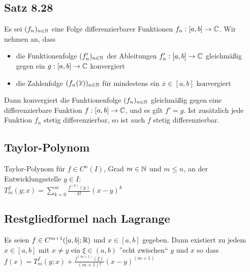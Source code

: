 \documentclass[german]{latex4ei/latex4ei_sheet}
\begin{document}



\begin{sectionbox}
	\subsection{Satz 8.28}
	Es sei $(f_n)_{n \in \operatorname{\mathbb N}}$ eine Folge differenzierbarer Funktionen $f_n : [a, b] \rightarrow \mathbb C$. Wir nehmen an, dass
	\begin{itemize}
		\item die Funktionenfolge $(f'_n)_{n \in \operatorname{\mathbb N}}$ der Ableitungen $f'_n : [a, b] \rightarrow \mathbb C$ gleichmäßig gegen ein $ g : [a, b] \rightarrow \mathbb C$ konvergiert
		\item die Zahlenfolge $(f_n(\overline{x}))_{n \in \operatorname{\mathbb N}}$ für mindestens ein $\overline{x} \in  [a, b]$ konvergiert
	\end{itemize}
	Dann konvergiert die Funktionenfolge $(f_n)_{n \in \operatorname{\mathbb N}}$ gleichmäßig gegen eine differenzierbare Funktion $f : [a,b] \rightarrow \mathbb C$, und es gilt $f' = g$. Ist zusätzlich jede Funktion $f_n$ stetig differenzierbar, so ist auch $f$ stetig differenzierbar.

\end{sectionbox}

\begin{sectionbox}
	\subsection{Taylor-Polynom}
	Taylor-Polynom für $f \in C^n(I)$, Grad $m \in \operatorname{\mathbb N}$ und $m \le n$, an der Entwicklungsstelle $y \in I$:\\
	$T_m^f(y;x)= \sum \limits_{k=0}^{m} \frac{f^{(k)}(y)}{k!}(x-y)^k$

\end{sectionbox}

\begin{sectionbox}
	\subsection{Restgliedformel nach Lagrange}
	Es seien $f \in C^{m+1}([a, b]; \operatorname{\mathbb R})$ und $x \in [a, b]$ gegeben. Dann existiert zu jedem $x \in [a,b]$ mit $x \neq y$ ein $\xi \in (a,b)$ ”echt zwischen“ $y$ und $x$ so dass\\
	$f(x)=T_m^f(y;x)+\frac{f^{(m+1)}(\xi)}{(m+1)!}(x-y)^{(m+1)}$

\end{sectionbox}
\end{document}

